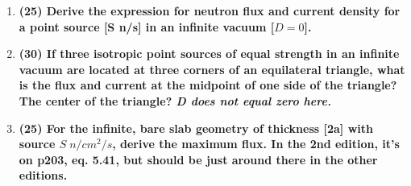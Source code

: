 \documentclass[11pt,a4paper]{article}
\begin{document}
\begin{enumerate}[leftmargin=*,topsep=0pt,font=\bfseries]
        
        \newpage 
    \item\textbf{(25) Derive the expression for neutron flux and current density for a point source [S n/s] in an infinite vacuum [$D = 0$].}
        \vspace{0.25in}\\
















        \newpage 
    \item\textbf{(30) If three isotropic point sources of equal strength in an infinite vacuum are located at three corners of an equilateral triangle, what is the flux and current at the midpoint of one side of the triangle? The center of the triangle? \textit{D does not equal zero here.}}
        \vspace{0.25in}\\













        \newpage 
    \item\textbf{(25) For the infinite, bare slab geometry of thickness [2a] with source $S \; n/cm^2/s$, derive the maximum flux. In the 2nd edition, it's on p203, eq. 5.41, but should be just around there in the other editions.}
        \vspace{0.25in}\\



















\end{enumerate}
\end{document}
